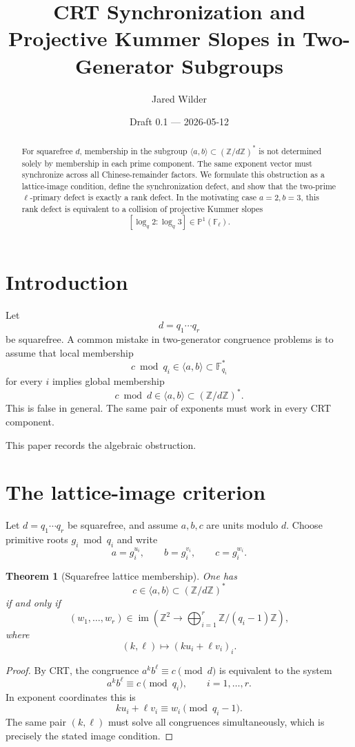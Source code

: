\documentclass[11pt]{article}
\title{CRT Synchronization and Projective Kummer Slopes in Two-Generator Subgroups}
\author{Jared Wilder}
\date{Draft 0.1 --- 2026-05-12}
\newtheorem{theorem}{Theorem}
\newcommand{\Z}{\mathbb Z}
\newcommand{\F}{\mathbb F}
\newcommand{\1}{\mathbf 1}
\newcommand{\im}{\operatorname{im}}
\begin{document}
\maketitle

\begin{abstract}
For squarefree \(d\), membership in the subgroup \(\langle a,b\rangle\subset(\Z/d\Z)^*\) is not determined solely by membership in each prime component.  The same exponent vector must synchronize across all Chinese-remainder factors.  We formulate this obstruction as a lattice-image condition, define the synchronization defect, and show that the two-prime \(\ell\)-primary defect is exactly a rank defect.  In the motivating case \(a=2,b=3\), this rank defect is equivalent to a collision of projective Kummer slopes
\[
[\log_q2:\log_q3]\in\mathbb P^1(\F_\ell).
\]
\end{abstract}

\section{Introduction}

Let
\[
d=q_1\cdots q_r
\]
be squarefree.  A common mistake in two-generator congruence problems is to assume that local membership
\[
c\bmod q_i\in\langle a,b\rangle\subset\F_{q_i}^*
\]
for every \(i\) implies global membership
\[
c\bmod d\in\langle a,b\rangle\subset(\Z/d\Z)^*.
\]
This is false in general.  The same pair of exponents must work in every CRT component.

This paper records the algebraic obstruction.

\section{The lattice-image criterion}

Let \(d=q_1\cdots q_r\) be squarefree, and assume \(a,b,c\) are units modulo \(d\).  Choose primitive roots \(g_i\bmod q_i\) and write
\[
a=g_i^{u_i},\qquad b=g_i^{v_i},\qquad c=g_i^{w_i}.
\]

\begin{theorem}[Squarefree lattice membership]\label{T:lattice}
One has
\[
c\in\langle a,b\rangle\subset(\Z/d\Z)^*
\]
if and only if
\[
(w_1,\dots,w_r)\in
\im\left(
\Z^2\to\bigoplus_{i=1}^r\Z/(q_i-1)\Z
\right),
\]
where
\[
(k,\ell)\mapsto(ku_i+\ell v_i)_i.
\]
\end{theorem}

\begin{proof}
By CRT, the congruence \(a^k b^\ell\equiv c\pmod d\) is equivalent to the system
\[
a^k b^\ell\equiv c\pmod {q_i},\qquad i=1,\dots,r.
\]
In exponent coordinates this is
\[
ku_i+\ell v_i\equiv w_i\pmod {q_i-1}.
\]
The same pair \((k,\ell)\) must solve all congruences simultaneously, which is precisely the stated image condition.
\end{proof}
\end{document}

